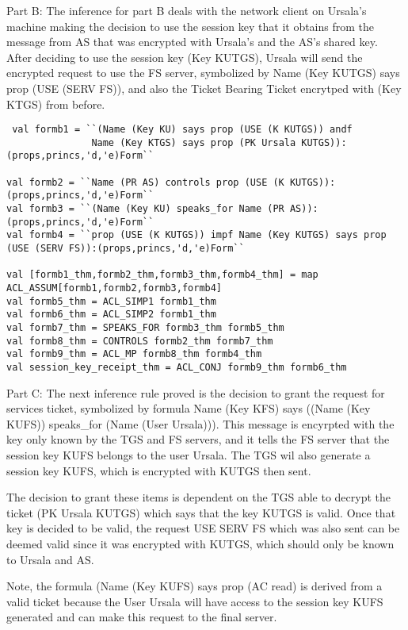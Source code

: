 \documentclass[11pt, twoside]{article}
\begin{document}
\newpage 

Part B: The inference for part B deals with the network client on Ursala's machine making
the decision to use the session key that it obtains from the message from AS that was encrypted
with Ursala's and the AS's shared key. After deciding to use the session key (Key KUTGS),
Ursala will send the encrypted request to use the FS server, symbolized by Name (Key KUTGS) says prop (USE (SERV FS)),
and also the Ticket Bearing Ticket encrytped with (Key KTGS) from before.

\HOLexamFourTheoremssessionXXkeyXXreceiptXXthm

\begin{lstlisting}
 val formb1 = ``(Name (Key KU) says prop (USE (K KUTGS)) andf
               Name (Key KTGS) says prop (PK Ursala KUTGS)):(props,princs,'d,'e)Form``
			   
val formb2 = ``Name (PR AS) controls prop (USE (K KUTGS)):(props,princs,'d,'e)Form``
val formb3 = ``(Name (Key KU) speaks_for Name (PR AS)):(props,princs,'d,'e)Form``
val formb4 = ``prop (USE (K KUTGS)) impf Name (Key KUTGS) says prop (USE (SERV FS)):(props,princs,'d,'e)Form``

val [formb1_thm,formb2_thm,formb3_thm,formb4_thm] = map ACL_ASSUM[formb1,formb2,formb3,formb4]
val formb5_thm = ACL_SIMP1 formb1_thm
val formb6_thm = ACL_SIMP2 formb1_thm
val formb7_thm = SPEAKS_FOR formb3_thm formb5_thm
val formb8_thm = CONTROLS formb2_thm formb7_thm
val formb9_thm = ACL_MP formb8_thm formb4_thm
val session_key_receipt_thm = ACL_CONJ formb9_thm formb6_thm
\end{lstlisting}

\newpage

Part C: The next inference rule proved is the decision to grant the request for services ticket, 
symbolized by formula Name (Key KFS) says ((Name (Key KUFS)) speaks_for (Name (User Ursala))). This message is
encyrpted with the key only known by the TGS and FS servers,  and it tells the FS server that the session key
KUFS belongs to the user Ursala. The TGS wil also generate a session key KUFS, which is encrypted with KUTGS then sent.

The decision to grant these items is dependent on the TGS able to decrypt the ticket (PK Ursala KUTGS) which says that
the key KUTGS is valid. Once that key is decided to be valid, the request USE SERV FS which was also sent can be deemed valid since
it was encrypted with KUTGS, which should only be known to Ursala and AS.

Note, the formula (Name (Key KUFS) says prop (AC read) is derived from a valid ticket because the User Ursala will have access to the session
key KUFS generated and can make this request to the final server. 
\end{document}
